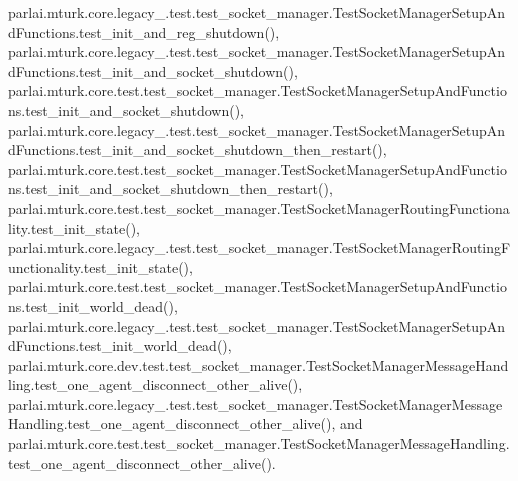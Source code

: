 parlai.\+mturk.\+core.\+legacy\+\_.\+test.\+test\+\_\+socket\+\_\+manager.\+Test\+Socket\+Manager\+Setup\+And\+Functions.\+test\+\_\+init\+\_\+and\+\_\+reg\+\_\+shutdown(), parlai.\+mturk.\+core.\+legacy\+\_.\+test.\+test\+\_\+socket\+\_\+manager.\+Test\+Socket\+Manager\+Setup\+And\+Functions.\+test\+\_\+init\+\_\+and\+\_\+socket\+\_\+shutdown(), parlai.\+mturk.\+core.\+test.\+test\+\_\+socket\+\_\+manager.\+Test\+Socket\+Manager\+Setup\+And\+Functions.\+test\+\_\+init\+\_\+and\+\_\+socket\+\_\+shutdown(), parlai.\+mturk.\+core.\+legacy\+\_.\+test.\+test\+\_\+socket\+\_\+manager.\+Test\+Socket\+Manager\+Setup\+And\+Functions.\+test\+\_\+init\+\_\+and\+\_\+socket\+\_\+shutdown\+\_\+then\+\_\+restart(), parlai.\+mturk.\+core.\+test.\+test\+\_\+socket\+\_\+manager.\+Test\+Socket\+Manager\+Setup\+And\+Functions.\+test\+\_\+init\+\_\+and\+\_\+socket\+\_\+shutdown\+\_\+then\+\_\+restart(), parlai.\+mturk.\+core.\+test.\+test\+\_\+socket\+\_\+manager.\+Test\+Socket\+Manager\+Routing\+Functionality.\+test\+\_\+init\+\_\+state(), parlai.\+mturk.\+core.\+legacy\+\_.\+test.\+test\+\_\+socket\+\_\+manager.\+Test\+Socket\+Manager\+Routing\+Functionality.\+test\+\_\+init\+\_\+state(), parlai.\+mturk.\+core.\+test.\+test\+\_\+socket\+\_\+manager.\+Test\+Socket\+Manager\+Setup\+And\+Functions.\+test\+\_\+init\+\_\+world\+\_\+dead(), parlai.\+mturk.\+core.\+legacy\+\_.\+test.\+test\+\_\+socket\+\_\+manager.\+Test\+Socket\+Manager\+Setup\+And\+Functions.\+test\+\_\+init\+\_\+world\+\_\+dead(), parlai.\+mturk.\+core.\+dev.\+test.\+test\+\_\+socket\+\_\+manager.\+Test\+Socket\+Manager\+Message\+Handling.\+test\+\_\+one\+\_\+agent\+\_\+disconnect\+\_\+other\+\_\+alive(), parlai.\+mturk.\+core.\+legacy\+\_.\+test.\+test\+\_\+socket\+\_\+manager.\+Test\+Socket\+Manager\+Message\+Handling.\+test\+\_\+one\+\_\+agent\+\_\+disconnect\+\_\+other\+\_\+alive(), and parlai.\+mturk.\+core.\+test.\+test\+\_\+socket\+\_\+manager.\+Test\+Socket\+Manager\+Message\+Handling.\+test\+\_\+one\+\_\+agent\+\_\+disconnect\+\_\+other\+\_\+alive().

\mbox{\label{classparlai_1_1mturk_1_1core_1_1dev_1_1test_1_1test__socket__manager_1_1TestSocketManagerMessageHandling_ada834531ef21ca05a61d4742d03795f4}} 
